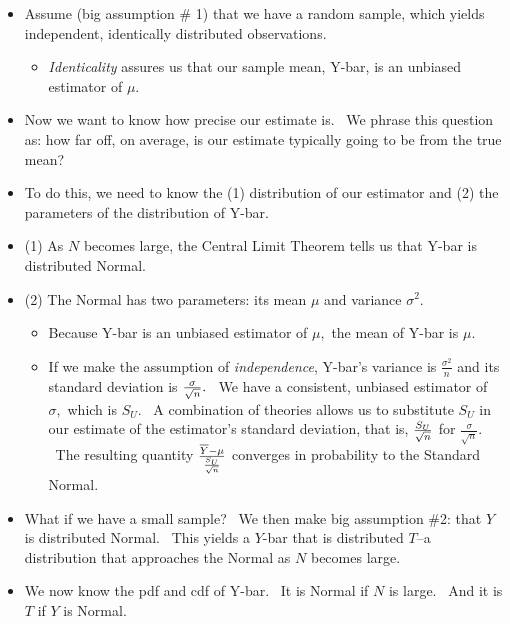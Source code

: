 \documentclass[11pt]{article}
\begin{document}
\begin{itemize}
\item Assume (big assumption \# 1) that we have a random sample, which
yields independent, identically distributed observations.

\begin{itemize}
\item \textit{Identicality} assures us that our sample mean, Y-bar, is an
unbiased estimator of $\mu .$
\end{itemize}

\item Now we want to know how precise our estimate is. \ We phrase this
question as: how far off, on average, is our estimate typically going to be
from the true mean?

\item To do this, we need to know the (1) distribution of our estimator and
(2) the parameters of the distribution of Y-bar.

\item (1) As $N$ becomes large, the Central Limit Theorem tells us that
Y-bar is distributed Normal.

\item (2) The Normal has two parameters: its mean $\mu $ and variance $%
\sigma ^{2}.$

\begin{itemize}
\item Because Y-bar is an unbiased estimator of $\mu ,$ the mean of Y-bar is 
$\mu .$

\item If we make the assumption of \textit{independence}, Y-bar's variance
is $\frac{\sigma ^{2}}{n}$ and its standard deviation is $\frac{\sigma }{%
\sqrt{n}}.$ \ We have a consistent, unbiased estimator of $\sigma ,$ which
is $S_{U}.$ \ A combination of theories allows us to substitute $S_{U}$ in
our estimate of the estimator's standard deviation, that is, $\frac{S_{U}}{%
\sqrt{n}}$ for $\frac{\sigma }{\sqrt{n}}.$ \ The resulting quantity $\frac{%
\overline{Y}-\mu }{\frac{S_{U}}{\sqrt{n}}}$ converges in probability to the
Standard Normal.
\end{itemize}

\item What if we have a small sample? \ We then make big assumption \#2:
that $Y$ is distributed Normal. \ This yields a $Y$-bar that is distributed $%
T$--a distribution that approaches the Normal as $N$ becomes large.

\item We now know the pdf and cdf of Y-bar. \ It is Normal if $N$ is large.
\ And it is $T$ if $Y$ is Normal.


\end{itemize}
\end{document}
